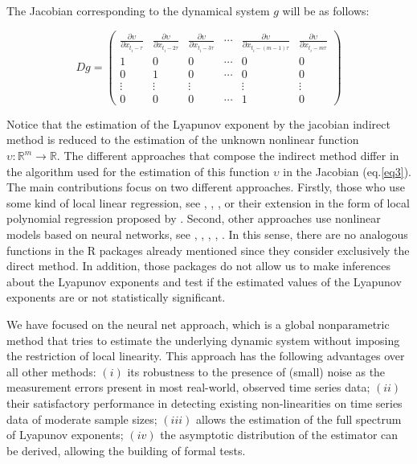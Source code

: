 The Jacobian corresponding to the dynamical system $g$ will be as follows:

\begin{equation}
Dg = \left( {\begin{array}{*{20}{c}}
  {\frac{{\partial \upsilon }}{{\partial {x_{{t_i} - \tau }}}}}&{\frac{{\partial \upsilon }}{{\partial {x_{{t_i} - 2\tau }}}}}&{\frac{{\partial \upsilon }}{{\partial {x_{{t_i} - 3\tau }}}}}& \cdots &{\frac{{\partial \upsilon }}{{\partial {x_{{t_i} - \left( {m - 1} \right)\tau }}}}}&{\frac{{\partial \upsilon }}{{\partial {x_{{t_i} - m\tau }}}}} \\ 
  1&0&0& \cdots &0&0 \\ 
  0&1&0& \cdots &0&0 \\ 
   \vdots & \vdots & \vdots &{}& \vdots & \vdots  \\ 
  0&0&0& \cdots &1&0 
\end{array}} \right)
\label{eq3}
\end{equation}

Notice that the estimation of the Lyapunov exponent by the jacobian indirect method is reduced to the estimation of the unknown nonlinear function $\upsilon:{\mathbb{R}^m} \to \mathbb{R}$. The different approaches that compose the indirect method differ in the algorithm used for the estimation of this function $\upsilon$ in the Jacobian (eq.\ref{eq3}). The main contributions focus on two different approaches. Firstly, those who use some kind of local linear regression, see \cite{Sano1985}, \cite{Eckmann1986}, \cite{Brown1991}, or their extension in the form of local polynomial regression proposed by \cite{Lu1997}. Second, other approaches use nonlinear models based on neural networks, see \cite{McCaffrey1992}, \cite{Nychka1992}, \cite{Dechert1992}, \cite{Whang1999}, \cite{Shintani2003, Shintani2004}. In this sense, there are no analogous functions in the R packages already mentioned since they consider exclusively the direct method. In addition, those packages do not allow us to make inferences about the Lyapunov exponents and test if the estimated values of the Lyapunov exponents are or not statistically significant.

We have focused on the neural net approach, which is a global nonparametric method that tries to estimate the underlying dynamic system without imposing the restriction of local linearity. This approach has the following advantages over all other methods: $\left( i \right)$ its robustness to the presence of (small) noise as the measurement errors present in most real-world, observed time series data; $\left( ii \right)$ their satisfactory performance in detecting existing non-linearities on time series data of moderate sample sizes; $\left( iii \right)$ allows the estimation of the full spectrum of Lyapunov exponents; $\left( iv \right)$ the asymptotic distribution of the estimator can be derived, allowing the building of formal tests. 

